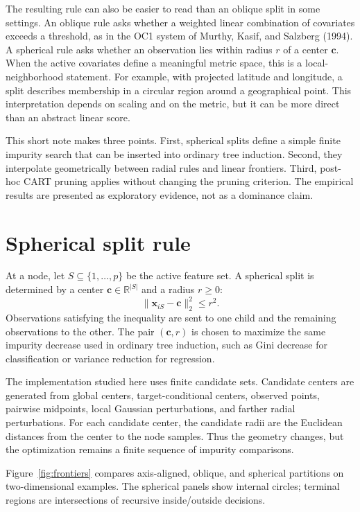 \documentclass[12pt]{article}
\begin{document}
The resulting rule can also be easier to read than an oblique split in some
settings. An oblique rule asks whether a weighted linear combination of
covariates exceeds a threshold, as in the OC1 system of Murthy, Kasif, and
Salzberg (1994). A spherical rule asks whether an observation lies within
radius $r$ of a center $\mathbf{c}$. When
the active covariates define a meaningful metric space, this is a
local-neighborhood statement. For example, with projected latitude and
longitude, a split describes membership in a circular region around a
geographical point. This interpretation depends on scaling and on the metric,
but it can be more direct than an abstract linear score.

This short note makes three points. First, spherical splits define a simple
finite impurity search that can be inserted into ordinary tree induction.
Second, they interpolate geometrically between radial rules and linear
frontiers. Third, post-hoc CART pruning applies without changing the pruning
criterion. The empirical results are presented as exploratory evidence, not as
a dominance claim.

\section{Spherical split rule}

At a node, let $S\subseteq\{1,\ldots,p\}$ be the active feature set. A spherical
split is determined by a center $\mathbf{c}\in\mathbb{R}^{|S|}$ and a radius
$r\ge 0$:
\[
    \|\mathbf{x}_{iS}-\mathbf{c}\|_2^2 \le r^2.
\]
Observations satisfying the inequality are sent to one child and the remaining
observations to the other. The pair $(\mathbf{c},r)$ is chosen to maximize the
same impurity decrease used in ordinary tree induction, such as Gini decrease
for classification or variance reduction for regression.

The implementation studied here uses finite candidate sets. Candidate centers
are generated from global centers, target-conditional centers, observed points,
pairwise midpoints, local Gaussian perturbations, and farther radial
perturbations. For each candidate center, the candidate radii are the Euclidean
distances from the center to the node samples. Thus the geometry changes, but
the optimization remains a finite sequence of impurity comparisons.

Figure~\ref{fig:frontiers} compares axis-aligned, oblique, and spherical
partitions on two-dimensional examples. The spherical panels show internal
circles; terminal regions are intersections of recursive inside/outside
decisions.
\end{document}

